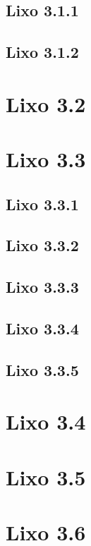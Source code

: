 \documentclass[11pt,twoside,a4paper]{report}
\begin{document}
\subsection{Lixo 3.1.1}

\subsection{Lixo 3.1.2}

\section{Lixo 3.2}

\section{Lixo 3.3}

\subsection{Lixo 3.3.1}

\subsection{Lixo 3.3.2}

\subsection{Lixo 3.3.3}

\subsection{Lixo 3.3.4}

\subsection{Lixo 3.3.5}

\section{Lixo 3.4}

\section{Lixo 3.5}

\section{Lixo 3.6}
\end{document}
